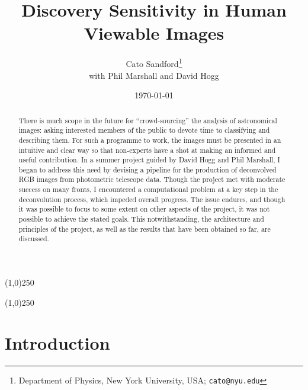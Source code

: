 \documentclass[letterpaper, 11pt]{article}
\title{Discovery Sensitivity in Human Viewable Images}
\author{Cato Sandford\thanks{Department of Physics, New York University, USA; \texttt{cato@nyu.edu}}\\ \small with Phil Marshall and David Hogg}
\date{\today}
\begin{document}
\maketitle
\vspace{1cm}


\begin{abstract}
There is much scope in the future for ``crowd-sourcing'' the analysis of astronomical images: asking interested members of the public to devote time to classifying and describing them. For such a programme to work, the images must be presented in an intuitive and clear way so that non-experts have a shot at making an informed and useful contribution. In a summer project guided by David Hogg and Phil Marshall, I began to address this need by devising a pipeline for the production of deconvolved RGB images from photometric telescope data. Though the project met with moderate success on many fronts, I encountered a computational problem at a key step in the deconvolution process, which impeded overall progress. The issue endures, and though it was possible to focus to some extent on other aspects of the project, it was not possible to achieve the stated goals. This notwithstanding, the architecture and principles of the project, as well as the results that have been obtained so far, are discussed.
\end{abstract}


\begin{center}
\line(1,0){250}
\end{center}
\vspace{-0.5cm}
\tableofcontents
\vspace{-0.1cm}
\begin{center}
\line(1,0){250}
\end{center}
\newpage



\section{Introduction}
\label{sec:intro}
\end{document}
